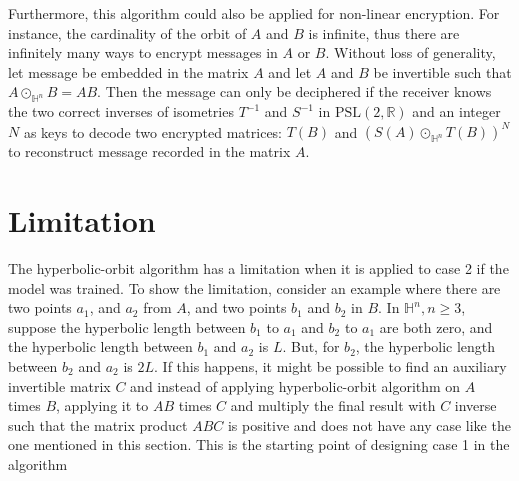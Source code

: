 \documentclass{article}
\theoremstyle{plain}
\theoremstyle{plain} %
\theoremstyle{definition}  %
\theoremstyle{remark}  %
\theoremstyle{plain}
\begin{document}
Furthermore, this algorithm could also be applied for non-linear encryption. For instance, the cardinality of the orbit of $A$ and $B$ is infinite, thus there are infinitely many ways to encrypt messages in $A$ or $B$. Without loss of generality, let message be embedded in the matrix $A$ and let $A$ and $B$ be invertible such that $A\odot_{\mathbb{H}^n} B = AB$.  Then the message can only be deciphered if the receiver knows the two correct inverses of isometries $T^{-1}$ and $S^{-1}$ in $\text{PSL}(2,\mathbb{R})$ and an integer $N$ as keys to decode two encrypted matrices: $T(B)$ and $(S(A)\odot_{\mathbb{H}^n} T(B))^N$ to reconstruct message recorded in the matrix $A$.

\section{Limitation}
The hyperbolic-orbit algorithm has a limitation when it is applied to case 2 if the model was trained. To show the limitation, consider an example where there are two points $a_1$, and $a_2$ from $A$, and two points $b_1$ and $b_2$ in $B$. In $\mathbb{H}^n, n\geq 3$, suppose the hyperbolic length between $b_1$ to $a_1$ and $b_2$ to $a_1$ are both zero, and the hyperbolic length between $b_1$ and $a_2$ is $L$. But, for $b_2$, the hyperbolic length between $b_2$ and $a_2$ is $2L$. If this happens, it might be possible to find an auxiliary invertible matrix $C$ and instead of applying hyperbolic-orbit algorithm on $A$ times $B$, applying it to $AB$ times $C$ and multiply the final result with $C$ inverse such that the matrix product $ABC$ is positive and does not have any case like the one mentioned in this section. This is the starting point of designing case 1 in the algorithm

\end{document}
